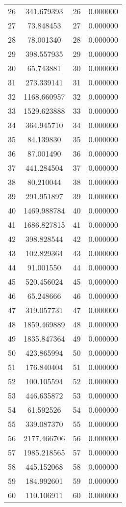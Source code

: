 \documentclass[12pt]{article}
\begin{document}
\begin{longtable}{@{}cccc@{}}
26 & 341.679393 & 26 & 0.000000 \\
27 & 73.848453 & 27 & 0.000000 \\
28 & 78.001340 & 28 & 0.000000 \\
29 & 398.557935 & 29 & 0.000000 \\
30 & 65.743881 & 30 & 0.000000 \\
31 & 273.339141 & 31 & 0.000000 \\
32 & 1168.660957 & 32 & 0.000000 \\
33 & 1529.623888 & 33 & 0.000000 \\
34 & 364.945710 & 34 & 0.000000 \\
35 & 84.139830 & 35 & 0.000000 \\
36 & 87.001490 & 36 & 0.000000 \\
37 & 441.284504 & 37 & 0.000000 \\
38 & 80.210044 & 38 & 0.000000 \\
39 & 291.951897 & 39 & 0.000000 \\
40 & 1469.988784 & 40 & 0.000000 \\
41 & 1686.827815 & 41 & 0.000000 \\
42 & 398.828544 & 42 & 0.000000 \\
43 & 102.829364 & 43 & 0.000000 \\
44 & 91.001550 & 44 & 0.000000 \\
45 & 520.456024 & 45 & 0.000000 \\
46 & 65.248666 & 46 & 0.000000 \\
47 & 319.057731 & 47 & 0.000000 \\
48 & 1859.469889 & 48 & 0.000000 \\
49 & 1835.847364 & 49 & 0.000000 \\
50 & 423.865994 & 50 & 0.000000 \\
51 & 176.840404 & 51 & 0.000000 \\
52 & 100.105594 & 52 & 0.000000 \\
53 & 446.635872 & 53 & 0.000000 \\
54 & 61.592526 & 54 & 0.000000 \\
55 & 339.087370 & 55 & 0.000000 \\
56 & 2177.466706 & 56 & 0.000000 \\
57 & 1985.218565 & 57 & 0.000000 \\
58 & 445.152068 & 58 & 0.000000 \\
59 & 184.992601 & 59 & 0.000000 \\
60 & 110.106911 & 60 & 0.000000 \\

\end{longtable}
\end{document}
